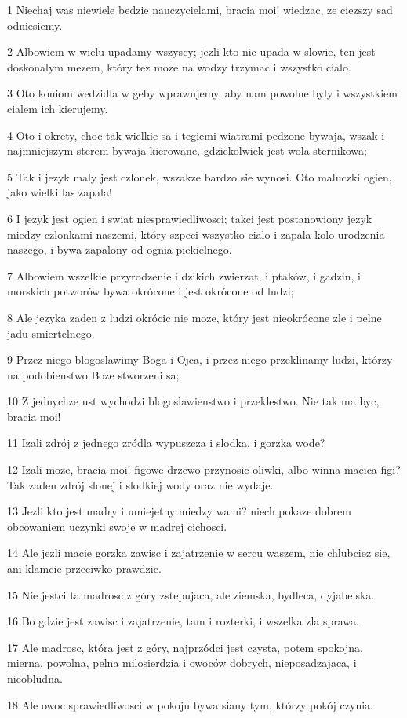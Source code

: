 \par 1 Niechaj was niewiele bedzie nauczycielami, bracia moi! wiedzac, ze ciezszy sad odniesiemy.
\par 2 Albowiem w wielu upadamy wszyscy; jezli kto nie upada w slowie, ten jest doskonalym mezem, który tez moze na wodzy trzymac i wszystko cialo.
\par 3 Oto koniom wedzidla w geby wprawujemy, aby nam powolne byly i wszystkiem cialem ich kierujemy.
\par 4 Oto i okrety, choc tak wielkie sa i tegiemi wiatrami pedzone bywaja, wszak i najmniejszym sterem bywaja kierowane, gdziekolwiek jest wola sternikowa;
\par 5 Tak i jezyk maly jest czlonek, wszakze bardzo sie wynosi. Oto maluczki ogien, jako wielki las zapala!
\par 6 I jezyk jest ogien i swiat niesprawiedliwosci; takci jest postanowiony jezyk miedzy czlonkami naszemi, który szpeci wszystko cialo i zapala kolo urodzenia naszego, i bywa zapalony od ognia piekielnego.
\par 7 Albowiem wszelkie przyrodzenie i dzikich zwierzat, i ptaków, i gadzin, i morskich potworów bywa okrócone i jest okrócone od ludzi;
\par 8 Ale jezyka zaden z ludzi okrócic nie moze, który jest nieokrócone zle i pelne jadu smiertelnego.
\par 9 Przez niego blogoslawimy Boga i Ojca, i przez niego przeklinamy ludzi, którzy na podobienstwo Boze stworzeni sa;
\par 10 Z jednychze ust wychodzi blogoslawienstwo i przeklestwo. Nie tak ma byc, bracia moi!
\par 11 Izali zdrój z jednego zródla wypuszcza i slodka, i gorzka wode?
\par 12 Izali moze, bracia moi! figowe drzewo przynosic oliwki, albo winna macica figi? Tak zaden zdrój slonej i slodkiej wody oraz nie wydaje.
\par 13 Jezli kto jest madry i umiejetny miedzy wami? niech pokaze dobrem obcowaniem uczynki swoje w madrej cichosci.
\par 14 Ale jezli macie gorzka zawisc i zajatrzenie w sercu waszem, nie chlubciez sie, ani klamcie przeciwko prawdzie.
\par 15 Nie jestci ta madrosc z góry zstepujaca, ale ziemska, bydleca, dyjabelska.
\par 16 Bo gdzie jest zawisc i zajatrzenie, tam i rozterki, i wszelka zla sprawa.
\par 17 Ale madrosc, która jest z góry, najprzódci jest czysta, potem spokojna, mierna, powolna, pelna milosierdzia i owoców dobrych, nieposadzajaca, i nieobludna.
\par 18 Ale owoc sprawiedliwosci w pokoju bywa siany tym, którzy pokój czynia.

